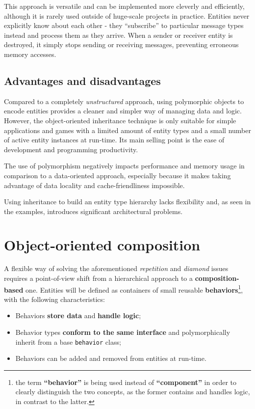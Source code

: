 \documentclass[twoside, 12pt, a4paper, openright]{book}
\begin{document}
This approach is versatile and can be implemented more cleverly and
efficiently, although it is rarely used outside of huge-scale projects
in practice. Entities never explicitly know about each other - they
``subscribe'' to particular message types instead and process them as
they arrive. When a sender or receiver entity is destroyed, it simply
stops sending or receiving messages, preventing erroneous memory
accesses.

\subsection{Advantages and
disadvantages}\label{advantages-and-disadvantages}

Compared to a completely \emph{unstructured} approach, using polymorphic
objects to encode entities provides a cleaner and simpler way of
managing data and logic. However, the object-oriented inheritance
technique is only suitable for simple applications and games with a
limited amount of entity types and a small number of active entity
instances at run-time. Its main selling point is the ease of development
and programming productivity.

The use of polymorphism negatively impacts performance and memory usage
in comparison to a data-oriented approach, especially because it makes
taking advantage of data locality and cache-friendliness impossible.

Using inheritance to build an entity type hierarchy lacks flexibility
and, as seen in the examples, introduces significant architectural
problems.

\section{Object-oriented composition}\label{object-oriented-composition}

A flexible way of solving the aforementioned \emph{repetition} and
\emph{diamond} issues requires a point-of-view shift from a hierarchical
approach to a \textbf{composition-based} one. Entities will be defined
as containers of small reusable \textbf{behaviors}\footnote{the term
  \textbf{``behavior''} is being used instead of \textbf{``component''}
  in order to clearly distinguish the two concepts, as the former
  contains and handles logic, in contrast to the latter.}, with the
following characteristics:

\begin{itemize}
\item
  Behaviors \textbf{store data} and \textbf{handle logic};
\item
  Behavior types \textbf{conform to the same interface} and
  polymorphically inherit from a base
  \texttt{behavior}
  class;
\item
  Behaviors can be added and removed from entities at run-time.
\end{itemize}
\end{document}
